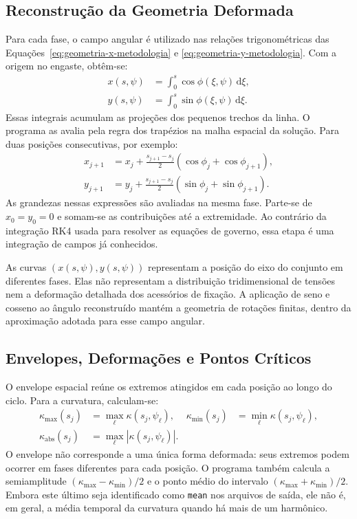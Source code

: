 \documentclass[arial,centeredequations,english,brazilian,oneside,section=TITLE]{ifes8}
\begin{document}
\subsection{Reconstrução da Geometria Deformada}
\label{sec:reconstrucao-geometria-linear}

Para cada fase, o campo angular é utilizado nas relações trigonométricas
das Equações~\eqref{eq:geometria-x-metodologia} e
\eqref{eq:geometria-y-metodologia}. Com a origem no engaste, obtêm-se:
\begin{align}
  x(s,\psi)&=\int_0^s\cos\phi(\xi,\psi)\,\mathrm{d}\xi,
    \label{eq:reconstrucao-coordenada-x}\\
  y(s,\psi)&=\int_0^s\sin\phi(\xi,\psi)\,\mathrm{d}\xi.
    \label{eq:reconstrucao-coordenada-y}
\end{align}
Essas integrais acumulam as projeções dos pequenos trechos da linha. O
programa as avalia pela regra dos trapézios na malha espacial da solução.
Para duas posições consecutivas, por exemplo:
\begin{align}
  x_{j+1}&=x_j+\frac{s_{j+1}-s_j}{2}
    \left(\cos\phi_j+\cos\phi_{j+1}\right),
    \label{eq:trapezios-geometria-x}\\
  y_{j+1}&=y_j+\frac{s_{j+1}-s_j}{2}
    \left(\sin\phi_j+\sin\phi_{j+1}\right).
    \label{eq:trapezios-geometria-y}
\end{align}
As grandezas nessas expressões são avaliadas na mesma fase. Parte-se de
$x_0=y_0=0$ e somam-se as contribuições até a extremidade. Ao contrário
da integração RK4 usada para resolver as equações de governo, essa etapa
é uma integração de campos já conhecidos.

As curvas $(x(s,\psi),y(s,\psi))$ representam a posição do eixo do conjunto
em diferentes fases. Elas não representam a distribuição tridimensional
de tensões nem a deformação detalhada dos acessórios de fixação. A aplicação
de seno e cosseno ao ângulo reconstruído mantém a geometria de rotações
finitas, dentro da aproximação adotada para esse campo angular.

\subsection{Envelopes, Deformações e Pontos Críticos}
\label{sec:reconstrucao-envelopes-lineares}

O envelope espacial reúne os extremos atingidos em cada posição ao longo
do ciclo. Para a curvatura, calculam-se:
\begin{align}
  \kappa_{\max}(s_j)&=\max_\ell\kappa(s_j,\psi_\ell),&
  \kappa_{\min}(s_j)&=\min_\ell\kappa(s_j,\psi_\ell),
    \label{eq:envelope-curvatura-extremos}\\
  \kappa_{\mathrm{abs}}(s_j)&=\max_\ell|\kappa(s_j,\psi_\ell)|.
    \label{eq:envelope-curvatura-absoluta}
\end{align}
O envelope não corresponde a uma única forma deformada: seus extremos
podem ocorrer em fases diferentes para cada posição. O programa também
calcula a semiamplitude
$(\kappa_{\max}-\kappa_{\min})/2$ e o ponto médio do intervalo
$(\kappa_{\max}+\kappa_{\min})/2$. Embora este último seja identificado
como \texttt{mean} nos arquivos de saída, ele não é, em geral, a média
temporal da curvatura quando há mais de um harmônico.
\end{document}
